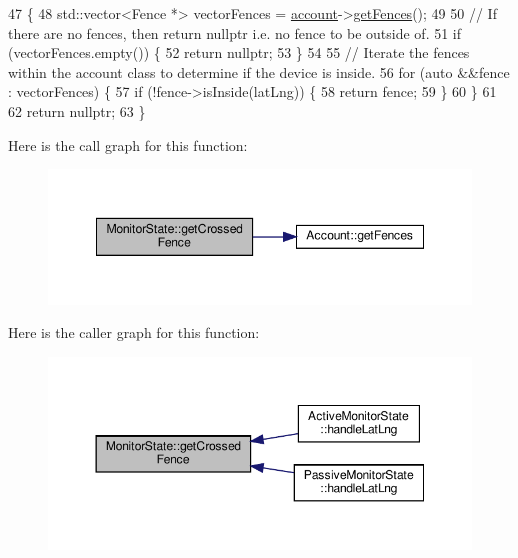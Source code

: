 \begin{DoxyCode}
47 \{
48     std::vector<Fence *> vectorFences = \hyperlink{class_monitor_state_a41128d4942ec0d5b107c63d1d95af811}{account}->\hyperlink{class_account_a5117acc0c4ef7be21c5339bd9ae84e40}{getFences}();
49 
50     \textcolor{comment}{// If there are no fences, then return nullptr i.e. no fence to be outside of.}
51     \textcolor{keywordflow}{if} (vectorFences.empty()) \{
52         \textcolor{keywordflow}{return} \textcolor{keyword}{nullptr};
53     \}
54 
55     \textcolor{comment}{// Iterate the fences within the account class to determine if the device is inside.}
56     \textcolor{keywordflow}{for} (\textcolor{keyword}{auto} &&fence : vectorFences) \{
57         \textcolor{keywordflow}{if} (!fence->isInside(latLng)) \{
58             \textcolor{keywordflow}{return} fence;
59         \}
60     \}
61 
62     \textcolor{keywordflow}{return} \textcolor{keyword}{nullptr};
63 \}
\end{DoxyCode}
Here is the call graph for this function\+:\nopagebreak
\begin{figure}[H]
\begin{center}
\leavevmode
\includegraphics[width=348pt]{dd/d45/class_monitor_state_a332c5f42bf46cd217e36f300e5279766_cgraph}
\end{center}
\end{figure}
Here is the caller graph for this function\+:\nopagebreak
\begin{figure}[H]
\begin{center}
\leavevmode
\includegraphics[width=350pt]{dd/d45/class_monitor_state_a332c5f42bf46cd217e36f300e5279766_icgraph}
\end{center}
\end{figure}
\mbox{\label{class_monitor_state_acb6d3a4de174058cb5b167fc04929ddb}} 
